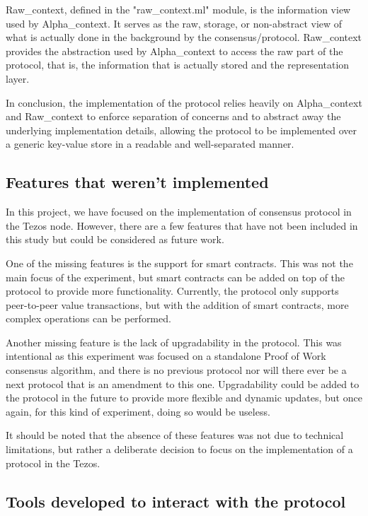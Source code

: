 Raw\_context, defined in the "raw\_context.ml" module, is the information view used by Alpha\_context. It serves as the raw, storage, or non-abstract view of what is actually done in the background by the consensus/protocol. Raw\_context provides the abstraction used by Alpha\_context to access the raw part of the protocol, that is, the information that is actually stored and the representation layer.

In conclusion, the implementation of the protocol relies heavily on Alpha\_context and Raw\_context to enforce separation of concerns and to abstract away the underlying implementation details, allowing the protocol to be implemented over a generic key-value store in a readable and well-separated manner.

\subsection*{Features that weren't implemented}
In this project, we have focused on the implementation of consensus protocol in the Tezos node. However, there are a few features that have not been included in this study but could be considered as future work.

One of the missing features is the support for smart contracts. This was not the main focus of the experiment, but smart contracts can be added on top of the protocol to provide more functionality. Currently, the protocol only supports peer-to-peer value transactions, but with the addition of smart contracts, more complex operations can be performed.

Another missing feature is the lack of upgradability in the protocol. This was intentional as this experiment was focused on a standalone Proof of Work consensus algorithm, and there is no previous protocol nor will there ever be a next protocol that is an amendment to this one. Upgradability could be added to the protocol in the future to provide more flexible and dynamic updates, but once again, for this kind of experiment, doing so would be useless.

It should be noted that the absence of these features was not due to technical limitations, but rather a deliberate decision to focus on the implementation of a protocol in the Tezos.

\subsection*{Tools developed to interact with the protocol}

